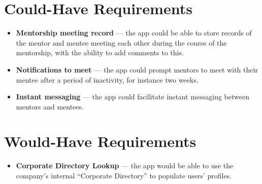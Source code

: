 \documentclass[11pt]{report}
\begin{document}
    \section*{Could-Have Requirements}
    \begin{itemize}
        \item \textbf{Mentorship meeting record} --- the app could be able to store records of the mentor and mentee meeting each other during the course of the mentorship, with the ability to add comments to this.
        \item \textbf{Notifications to meet} --- the app could prompt mentors to meet with their mentee after a period of inactivity, for instance two weeks.
        \item \textbf{Instant messaging} --- the app could facilitate instant messaging between mentors and mentees.
    \end{itemize}

    \section*{Would-Have Requirements}
    \begin{itemize}
        \item \textbf{Corporate Directory Lookup} --- the app would be able to use the company's internal ``Corporate Directory'' to populate users' profiles.
    \end{itemize}
\end{document}
